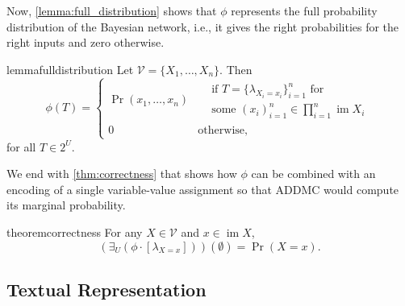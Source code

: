 \documentclass{uai2021} %
\theoremstyle{definition}
\DeclareMathOperator{\im}{im}
\begin{document}
Now, \cref{lemma:full_distribution} shows that $\phi$ represents the full
probability distribution of the Bayesian network, i.e., it gives the right
probabilities for the right inputs and zero otherwise. 

\begin{restatable}{lemma}{fulldistribution} \label{lemma:full_distribution}
  Let $\mathcal{V} = \{X_1, \dots, X_n\}$. Then
  \[
    \phi(T) =
    \begin{cases}
      \Pr(x_1, \dots, x_n) &
      \begin{aligned}
        &\text{if } T = \{ \lambda_{X_i=x_i} \}_{i = 1}^n \text{ for} \\
        &\text{some } \textstyle (x_i)_{i=1}^n \in \prod_{i=1}^n \im X_i
      \end{aligned} \\
      0 & \text{otherwise,}
    \end{cases}
  \]
  for all $T \in 2^U$.
\end{restatable}

We end with \cref{thm:correctness} that shows how $\phi$ can be combined with an
encoding of a single variable-value assignment so that \textsf{ADDMC} would
compute its marginal probability.

\begin{restatable}{theorem}{correctness} \label{thm:correctness}
  For any $X \in \mathcal{V}$ and $x \in \im X$,
  \[
    (\exists_U(\phi \cdot [\lambda_{X=x}]))(\emptyset) = \Pr(X = x).
  \]
\end{restatable}

\subsection{Textual Representation} \label{sec:textual_representation}
\end{document}

